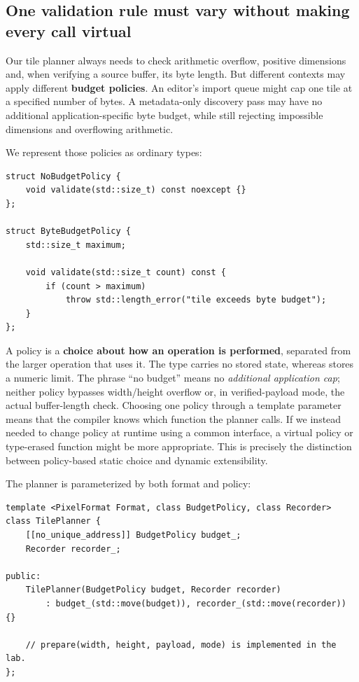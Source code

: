 \subsection{One validation rule must vary without making every call virtual}\label{05-engine-i-ch005-one-validation-rule-must-vary-without-making-every-call-virtual}

\hypertarget{05-engine-i-ch005-one-validation-rule-must-vary-without-making-every-call-virtual}{}

Our tile planner always needs to check arithmetic overflow, positive dimensions and, when verifying a source buffer, its byte length. But different contexts may apply different \textbf{budget policies}. An editor's import queue might cap one tile at a specified number of bytes. A metadata-only discovery pass may have no additional application-specific byte budget, while still rejecting impossible dimensions and overflowing arithmetic.

We represent those policies as ordinary types:

\begin{verbatim}
struct NoBudgetPolicy {
    void validate(std::size_t) const noexcept {}
};

struct ByteBudgetPolicy {
    std::size_t maximum;

    void validate(std::size_t count) const {
        if (count > maximum)
            throw std::length_error("tile exceeds byte budget");
    }
};
\end{verbatim}

A policy is a \textbf{choice about how an operation is performed}, separated from the larger operation that uses it. The type  carries no stored state, whereas  stores a numeric limit. The phrase ``no budget'' means no \emph{additional application cap}; neither policy bypasses width/height overflow or, in verified-payload mode, the actual buffer-length check. Choosing one policy through a template parameter means that the compiler knows which  function the planner calls. If we instead needed to change policy at runtime using a common interface, a virtual policy or type-erased function might be more appropriate. This is precisely the distinction between policy-based static choice and dynamic extensibility.

The planner is parameterized by both format and policy:

\begin{verbatim}
template <PixelFormat Format, class BudgetPolicy, class Recorder>
class TilePlanner {
    [[no_unique_address]] BudgetPolicy budget_;
    Recorder recorder_;

public:
    TilePlanner(BudgetPolicy budget, Recorder recorder)
        : budget_(std::move(budget)), recorder_(std::move(recorder)) {}

    // prepare(width, height, payload, mode) is implemented in the lab.
};
\end{verbatim}

